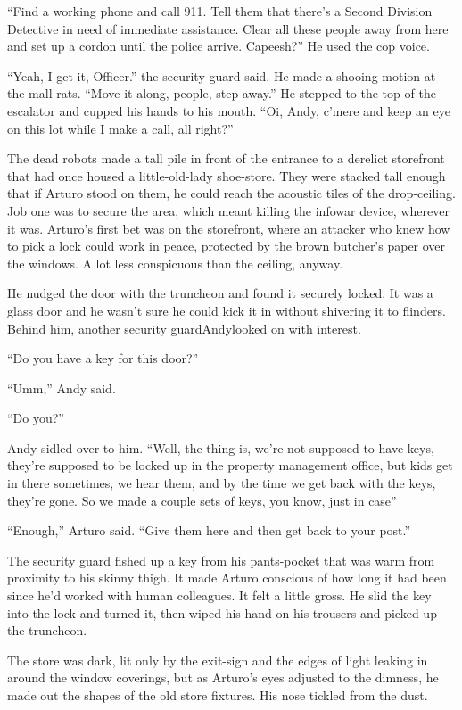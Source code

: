 “Find a working phone and call 911. Tell them that there’s a Second
Division Detective in need of immediate assistance. Clear all these
people away from here and set up a cordon until the police arrive.
Capeesh?” He used the cop voice.

“Yeah, I get it, Officer.” the security guard said. He made a
shooing motion at the mall-rats. “Move it along, people, step
away.” He stepped to the top of the escalator and cupped his hands
to his mouth. “Oi, Andy, c’mere and keep an eye on this lot while I
make a call, all right?”

\tb

The dead robots made a tall pile in front of the entrance to a
derelict storefront that had once housed a little-old-lady
shoe-store. They were stacked tall enough that if Arturo stood on
them, he could reach the acoustic tiles of the drop-ceiling. Job
one was to secure the area, which meant killing the infowar device,
wherever it was. Arturo’s first bet was on the storefront, where an
attacker who knew how to pick a lock could work in peace, protected
by the brown butcher’s paper over the windows. A lot less
conspicuous than the ceiling, anyway.

He nudged the door with the truncheon and found it securely locked.
It was a glass door and he wasn’t sure he could kick it in without
shivering it to flinders. Behind him, another security
guard{\dash}Andy{\dash}looked on with interest.

“Do you have a key for this door?”

“Umm,” Andy said.

“Do you?”

Andy sidled over to him. “Well, the thing is, we’re not supposed to
have keys, they’re supposed to be locked up in the property
management office, but kids get in there sometimes, we hear them,
and by the time we get back with the keys, they’re gone. So we made
a couple sets of keys, you know, just in case{\dash}”

“Enough,” Arturo said. “Give them here and then get back to your
post.”

The security guard fished up a key from his pants-pocket that was
warm from proximity to his skinny thigh. It made Arturo conscious
of how long it had been since he’d worked with human colleagues. It
felt a little gross. He slid the key into the lock and turned it,
then wiped his hand on his trousers and picked up the truncheon.

The store was dark, lit only by the exit-sign and the edges of
light leaking in around the window coverings, but as Arturo’s eyes
adjusted to the dimness, he made out the shapes of the old store
fixtures. His nose tickled from the dust.

